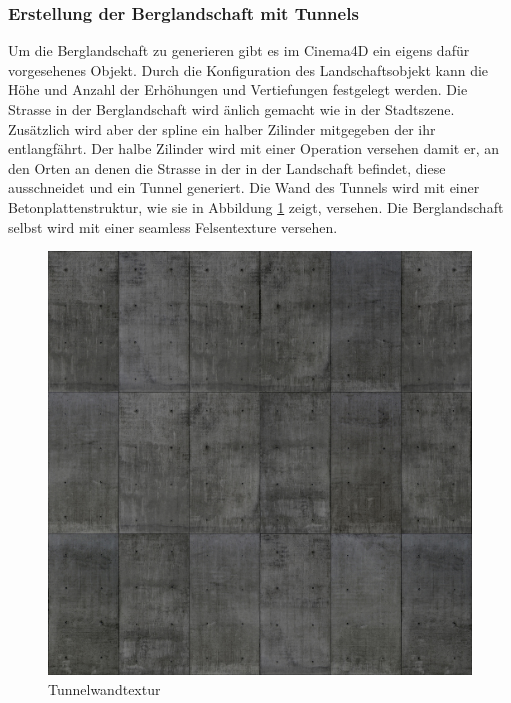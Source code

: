 \subsubsection{Erstellung der Berglandschaft mit Tunnels}
Um die Berglandschaft zu generieren gibt es im Cinema4D ein eigens dafür vorgesehenes Objekt. Durch die Konfiguration des Landschaftsobjekt kann die Höhe und Anzahl der Erhöhungen und Vertiefungen festgelegt werden. Die Strasse in der Berglandschaft wird änlich gemacht wie in der Stadtszene. Zusätzlich wird aber der \gls{spline} ein halber Zilinder mitgegeben der ihr entlangfährt. Der halbe Zilinder wird mit einer Operation versehen damit er, an den Orten an denen die Strasse in der in der Landschaft befindet, diese ausschneidet und ein Tunnel generiert. Die Wand des Tunnels wird mit einer Betonplattenstruktur, wie sie in Abbildung \ref{texture_concretetiles} zeigt, versehen. Die Berglandschaft selbst wird mit einer \gls{seamless} Felsentexture versehen. 
\begin{figure}[htbp]
\centering 
\includegraphics[scale=0.6]{src/texture_concretetiles.png}
\caption{Tunnelwandtextur} %
\label{texture_concretetiles} %
\end{figure}

